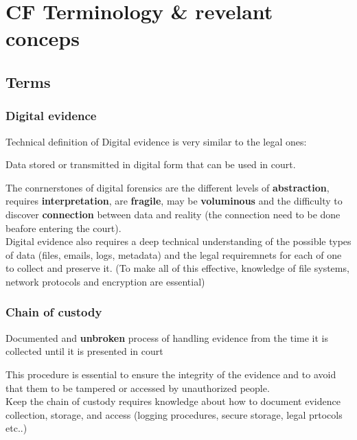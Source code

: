 \chapter{CF Terminology \& revelant conceps}

\section{Terms}

\subsection{Digital evidence}
Technical definition of Digital evidence is very similar to the legal ones:
\begin{boxH}
    Data stored or transmitted in digital form that can be used in court.
\end{boxH}
 
The conrnerstones of digital forensics are the different levels of \textbf{abstraction}, requires 
\textbf{interpretation}, are \textbf{fragile}, may be \textbf{voluminous} 
and the difficulty to discover \textbf{connection} between
data and reality (the connection need to be done beafore entering the court). \\

Digital evidence also requires a deep technical understanding of the possible types of data 
(files, emails, logs, metadata) and the legal requiremnets for each of one to collect and preserve it. 
(To make all of this effective, knowledge of file systems, network protocols 
and encryption are essential) \\


\subsection{Chain of custody}
\begin{boxH}
    Documented and \textbf{unbroken} process of handling evidence 
    from the time it is collected until it is presented in court
\end{boxH}

This procedure is essential to ensure the integrity of the evidence and to avoid 
that them to be tampered or accessed by unauthorized people. \\
Keep the chain of custody requires knowledge about how to document evidence 
collection, storage, and access (logging procedures, secure storage, legal prtocols etc..) \\

